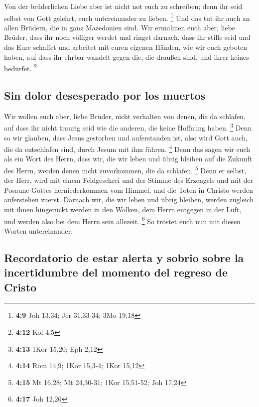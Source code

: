  Von der brüderlichen Liebe aber ist nicht not euch zu
schreiben; denn ihr seid selbst von Gott gelehrt, euch untereinander zu
lieben. \footnote{\textbf{4:9} Joh 13,34; Jer 31,33-34; 3Mo 19,18}
 Und das tut ihr auch an allen Brüdern, die in ganz
Mazedonien sind. Wir ermahnen euch aber, liebe Brüder, dass ihr noch
völliger werdet  und ringet darnach, dass ihr stille seid
und das Eure schaffet und arbeitet mit euren eigenen Händen, wie wir
euch geboten haben,  auf dass ihr ehrbar wandelt gegen
die, die draußen sind, und ihrer keines bedürfet. \footnote{\textbf{4:12}
  Kol 4,5}

\hypertarget{sin-dolor-desesperado-por-los-muertos}{%
\subsection{Sin dolor desesperado por los
muertos}\label{sin-dolor-desesperado-por-los-muertos}}

 Wir wollen euch aber, liebe Brüder, nicht verhalten von
denen, die da schlafen, auf dass ihr nicht traurig seid wie die anderen,
die keine Hoffnung haben. \footnote{\textbf{4:13} 1Kor 15,20; Eph 2,12}
 Denn so wir glauben, dass Jesus gestorben und
auferstanden ist, also wird Gott auch, die da entschlafen sind, durch
Jesum mit ihm führen. \footnote{\textbf{4:14} Röm 14,9; 1Kor 15,3-4;
  1Kor 15,12}  Denn das sagen wir euch als ein Wort des
Herrn, dass wir, die wir leben und übrig bleiben auf die Zukunft des
Herrn, werden denen nicht zuvorkommen, die da schlafen. \footnote{\textbf{4:15}
  Mt 16,28; Mt 24,30-31; 1Kor 15,51-52; Joh 17,24}  Denn
er selbst, der Herr, wird mit einem Feldgeschrei und der Stimme des
Erzengels und mit der Posaune Gottes herniederkommen vom Himmel, und die
Toten in Christo werden auferstehen zuerst.  Darnach wir,
die wir leben und übrig bleiben, werden zugleich mit ihnen hingerückt
werden in den Wolken, dem Herrn entgegen in der Luft, und werden also
bei dem Herrn sein allezeit. \footnote{\textbf{4:17} Joh 12,26}
 So tröstet euch nun mit diesen Worten untereinander.

\hypertarget{recordatorio-de-estar-alerta-y-sobrio-sobre-la-incertidumbre-del-momento-del-regreso-de-cristo}{%
\subsection{Recordatorio de estar alerta y sobrio sobre la incertidumbre
del momento del regreso de
Cristo}\label{recordatorio-de-estar-alerta-y-sobrio-sobre-la-incertidumbre-del-momento-del-regreso-de-cristo}}

